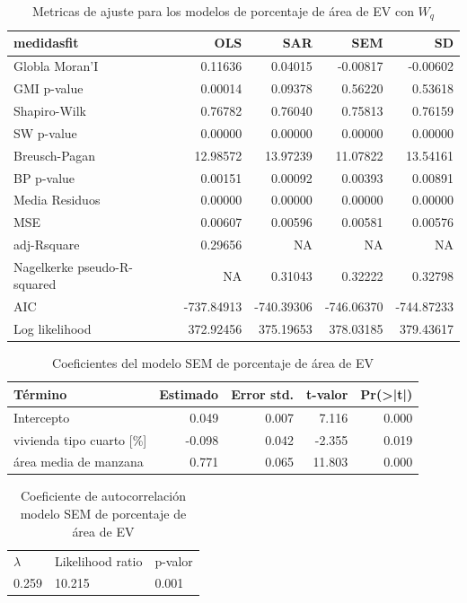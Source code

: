 \documentclass[12pt,a4paper,openany]{book}
\theoremstyle{definition}
\theoremstyle{definition}
\theoremstyle{definition}
\theoremstyle{remark}
\begin{document}
\begin{table}[H]

\caption{\label{tab:tabla-comp-modelos-areaep}Metricas de ajuste para los modelos de porcentaje de área de EV con $W_q$}
\centering
\begin{tabular}{lrrrr}
\toprule
medidasfit & OLS & SAR & SEM & SD\\
\midrule
Globla Moran'I & 0.11636 & 0.04015 & -0.00817 & -0.00602\\
GMI p-value & 0.00014 & 0.09378 & 0.56220 & 0.53618\\
Shapiro-Wilk & 0.76782 & 0.76040 & 0.75813 & 0.76159\\
SW p-value & 0.00000 & 0.00000 & 0.00000 & 0.00000\\
Breusch-Pagan & 12.98572 & 13.97239 & 11.07822 & 13.54161\\
\addlinespace
BP p-value & 0.00151 & 0.00092 & 0.00393 & 0.00891\\
Media Residuos & 0.00000 & 0.00000 & 0.00000 & 0.00000\\
MSE & 0.00607 & 0.00596 & 0.00581 & 0.00576\\
adj-Rsquare & 0.29656 & NA & NA & NA\\
Nagelkerke pseudo-R-squared & NA & 0.31043 & 0.32222 & 0.32798\\
\addlinespace
AIC & -737.84913 & -740.39306 & -746.06370 & -744.87233\\
Log likelihood & 372.92456 & 375.19653 & 378.03185 & 379.43617\\
\bottomrule
\end{tabular}
\end{table}

\begin{table}[H]

\caption{\label{tab:coef-sem-areaep}Coeficientes del modelo SEM de porcentaje de área de EV}
\centering
\begin{tabular}{lrrrr}
\toprule
Término & Estimado & Error std. & t-valor & Pr(>|t|)\\
\midrule
Intercepto & 0.049 & 0.007 & 7.116 & 0.000\\
vivienda tipo cuarto [\%] & -0.098 & 0.042 & -2.355 & 0.019\\
área media de manzana & 0.771 & 0.065 & 11.803 & 0.000\\
\bottomrule
\end{tabular}
\end{table}

\begin{table}[H]

\caption{\label{tab:cauto-sem-areaep}Coeficiente de autocorrelación modelo SEM de porcentaje de área de EV}
\centering
\begin{tabular}{lll}
\toprule
$\lambda$ & Likelihood ratio & p-valor\\
0.259 & 10.215 & 0.001\\
\bottomrule
\end{tabular}
\end{table}
\end{document}
